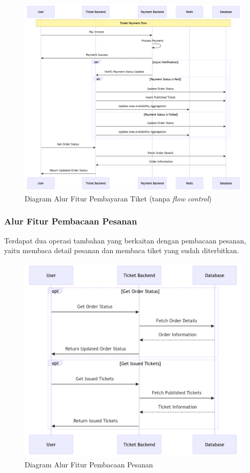 \begin{figure}[h]
    \centering
    \includegraphics[width=1\textwidth]{resources/chapter-3/order-payment.png}
    \caption{Diagram Alur Fitur Pembayaran Tiket (tanpa \textit{flow control})}
    \label{fig:flow-order-payment-fc}
\end{figure}

\pagebreak

\subsubsection{Alur Fitur Pembacaan Pesanan}

Terdapat dua operasi tambahan yang berkaitan dengan pembacaan pesanan, yaitu membaca detail pesanan dan membaca tiket yang sudah diterbitkan.

\begin{figure}[h]
    \centering
    \includegraphics[width=1\textwidth]{resources/chapter-3/order-flow.png}
    \caption{Diagram Alur Fitur Pembacaan Pesanan}
    \label{fig:flow-order-flow}
\end{figure}